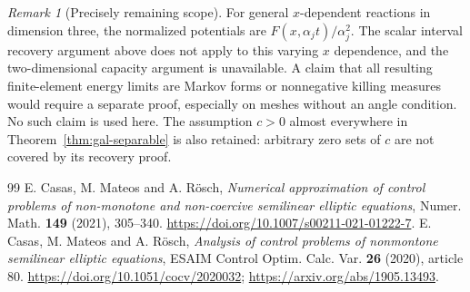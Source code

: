 \documentclass[11pt,a4paper]{article}
\theoremstyle{definition}
\theoremstyle{remark}
\newtheorem{remark}[theorem]{Remark}
\numberwithin{equation}{section}
\begin{document}
\begin{remark}[Precisely remaining scope]
For general $x$-dependent reactions in dimension three, the normalized potentials are $F(x,\alpha_j t)/\alpha_j^2$. The scalar interval recovery argument above does not apply to this varying $x$ dependence, and the two-dimensional capacity argument is unavailable. A claim that all resulting finite-element energy limits are Markov forms or nonnegative killing measures would require a separate proof, especially on meshes without an angle condition. No such claim is used here. The assumption $c>0$ almost everywhere in Theorem~\ref{thm:gal-separable} is also retained: arbitrary zero sets of $c$ are not covered by its recovery proof.
\end{remark}

\begin{thebibliography}{99}
E. Casas, M. Mateos and A. R\"osch, \emph{Numerical approximation of control problems of non-monotone and non-coercive semilinear elliptic equations}, Numer. Math. \textbf{149} (2021), 305--340. \url{https://doi.org/10.1007/s00211-021-01222-7}.
E. Casas, M. Mateos and A. R\"osch, \emph{Analysis of control problems of nonmontone semilinear elliptic equations}, ESAIM Control Optim. Calc. Var. \textbf{26} (2020), article 80. \url{https://doi.org/10.1051/cocv/2020032}; \url{https://arxiv.org/abs/1905.13493}.
\end{thebibliography}
\end{document}
